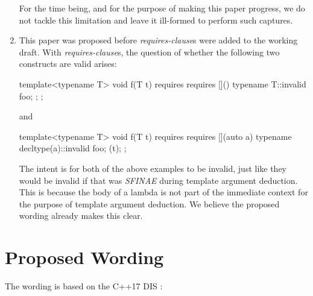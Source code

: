 \documentclass{wg21}
\begin{document}
\begin{enumerate}
    For the time being, and for the purpose of making this paper progress, we
    do not tackle this limitation and leave it ill-formed to perform such
    captures.

  \item This paper was proposed before \textit{requires-clause}s were added to
        the working draft. With \textit{requires-clause}s, the question of
        whether the following two constructs are valid arises:

        \begin{cpp}
          template<typename T>
          void f(T t) requires requires {
            []() { typename T::invalid foo; };
          };
        \end{cpp}

        and

        \begin{cpp}
          template<typename T>
          void f(T t) requires requires {
            [](auto a) { typename decltype(a)::invalid foo; }(t);
          };
        \end{cpp}

        The intent is for both of the above examples to be invalid, just like
        they would be invalid if that was \textit{SFINAE} during template
        argument deduction. This is because the body of a lambda is not part
        of the immediate context for the purpose of template argument deduction.
        We believe the proposed wording already makes this clear.
\end{enumerate}


\section{Proposed Wording}
The wording is based on the C++17 DIS \cite{N4659}:
\end{document}
